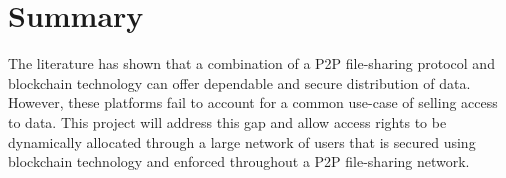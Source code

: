 
\section{Summary}

The literature has shown that a combination of a P2P file-sharing protocol and blockchain technology can offer dependable and secure distribution of data. However, these platforms fail to account for a common use-case of selling access to data. This project will address this gap and allow access rights to be dynamically allocated through a large network of users that is secured using blockchain technology and enforced throughout a P2P file-sharing network.
